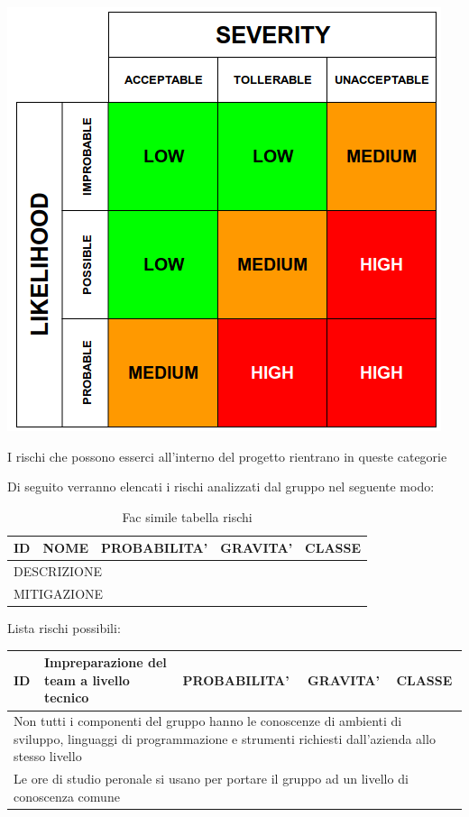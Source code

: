 	\begin{center}
		\includegraphics[scale=0.5]{img/tabella.png}
	\end{center}


	I rischi che possono esserci all'interno del progetto rientrano in queste categorie
	
	Di seguito verranno elencati i rischi analizzati dal gruppo nel seguente modo:
	
	\begin{table}[H]
		\centering
		\begin{tabularx}{\columnwidth}{|m{1.5cm}|m{4.2cm}|m{2.7cm}|m{2.7cm}|m{2.7cm}|}
			\hline
			ID & 
			NOME & 
			PROBABILITA' & 
			GRAVITA' & 
			CLASSE\\
			\hline
			\multicolumn{5}{|X|}{
				DESCRIZIONE
			}\\
			\hline
			\multicolumn{5}{|X|}{
				MITIGAZIONE
			}\\
			\hline
		\end{tabularx}
		\caption{Fac simile tabella rischi}
	\end{table}
	
	
	Lista rischi possibili: 
	
	\begin{table}[H]
		\centering
		\begin{tabularx}{\columnwidth}{|m{1.5cm}|m{4.2cm}|m{2.7cm}|m{2.7cm}|m{2.7cm}|}
			\hline
			ID & 
			Impreparazione del team a livello tecnico &
			PROBABILITA' & 
			GRAVITA' &
			CLASSE\\
			\hline
			\multicolumn{5}{|X|}{
				Non tutti i componenti del gruppo hanno le conoscenze di ambienti di sviluppo, linguaggi di programmazione e strumenti richiesti dall'azienda allo stesso livello
			}\\
			\hline
			\multicolumn{5}{|X|}{
				Le ore di studio peronale si usano per portare il gruppo ad un livello di conoscenza comune
			}\\
			\hline
		\end{tabularx}
	\end{table}

